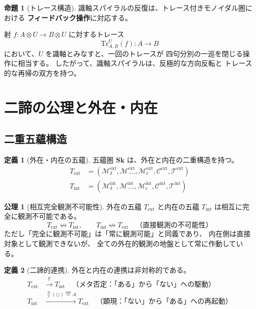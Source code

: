 \documentclass[11pt,a4paper]{article}
\theoremstyle{definition}
\newtheorem{definition}{定義}[section]
\newtheorem{axiom}{公理}[section]
\newtheorem{proposition}{命題}[section]
\newcommand{\Sk}{\mathbf{Sk}}
\newcommand{\Mdelta}{\mathcal{M}_{\delta}}
\newcommand{\Mneg}{\mathcal{M}_{\neg\neg}}
\newcommand{\Mr}{\mathcal{M}_{\mathrm{r}}}
\newcommand{\Mc}{\mathcal{C}}
\newcommand{\T}{\mathcal{T}}
\newcommand{\trace}{\mathrm{Tr}}
\newcommand{\ext}{\mathrm{ext}}
\newcommand{\intn}{\mathrm{int}}
\newcommand{\TExt}{T_{\ext}}
\newcommand{\TInt}{T_{\intn}}
\begin{document}
\begin{proposition}[トレース構造]
識軸スパイラルの反復は、トレース付きモノイダル圏における
\textbf{フィードバック操作}に対応する。

射 $f : A \otimes U \to B \otimes U$ に対するトレース
\begin{equation}
\trace^U_{A,B}(f) : A \to B
\end{equation}
において、$U$ を識軸とみなすと、一回のトレースが
四句分別の一巡を閉じる操作に相当する。
したがって、識軸スパイラルは、反極的な方向反転と
トレース的な再帰の双方を持つ。
\end{proposition}

\section{二諦の公理と外在・内在}

\subsection{二重五蘊構造}

\begin{definition}[外在・内在の五蘊]
五蘊圏 $\Sk$ は、外在と内在の二重構造を持つ。
\begin{align}
\TExt &= (\Mdelta^{\ext}, \Mneg^{\ext}, \Mr^{\ext}, \Mc^{\ext}, \T^{\ext}) \\
\TInt &= (\Mdelta^{\intn}, \Mneg^{\intn}, \Mr^{\intn}, \Mc^{\intn}, \T^{\intn})
\end{align}
\end{definition}

\begin{axiom}[相互完全観測不可能性]
外在の五蘊 $\TExt$ と内在の五蘊 $\TInt$ は相互に完全に観測不可能である。
\begin{equation}
\TExt \not\leftrightarrow \TInt, \qquad
\TInt \not\leftrightarrow \TExt \quad \text{（直接観測の不可能性）}
\end{equation}
ただし「完全に観測不可能」は「常に観測可能」と同義であり、
内在側は直接対象として観測できないが、
全ての外在的観測の地盤として常に作動している。
\end{axiom}

\begin{definition}[二諦的連携]
外在と内在の連携は非対称的である。
\begin{align}
\TExt &\xrightarrow{\Uparrow} \TInt 
\quad \text{（メタ否定：「ある」から「ない」への駆動）} \\
\TInt &\xrightarrow{\Uparrow(\bigcirc) \stackrel{\mathrm{mw}}{=} A} \TExt 
\quad \text{（顕現：「ない」から「ある」への再起動）}
\end{align}
\end{definition}
\end{document}
